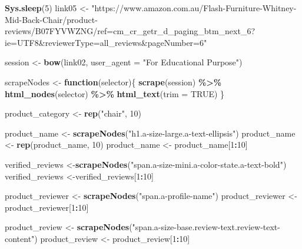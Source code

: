 \documentclass[
]{article}
\newenvironment{Shaded}{\begin{snugshade}}{\end{snugshade}}
\newcommand{\AttributeTok}[1]{\textcolor[rgb]{0.13,0.29,0.53}{#1}}
\newcommand{\ConstantTok}[1]{\textcolor[rgb]{0.56,0.35,0.01}{#1}}
\newcommand{\ControlFlowTok}[1]{\textcolor[rgb]{0.13,0.29,0.53}{\textbf{#1}}}
\newcommand{\DecValTok}[1]{\textcolor[rgb]{0.00,0.00,0.81}{#1}}
\newcommand{\FunctionTok}[1]{\textcolor[rgb]{0.13,0.29,0.53}{\textbf{#1}}}
\newcommand{\NormalTok}[1]{#1}
\newcommand{\OtherTok}[1]{\textcolor[rgb]{0.56,0.35,0.01}{#1}}
\newcommand{\SpecialCharTok}[1]{\textcolor[rgb]{0.81,0.36,0.00}{\textbf{#1}}}
\newcommand{\StringTok}[1]{\textcolor[rgb]{0.31,0.60,0.02}{#1}}
\begin{document}
\begin{Shaded}
\begin{Highlighting}[]
  \FunctionTok{Sys.sleep}\NormalTok{(}\DecValTok{5}\NormalTok{)}
\NormalTok{link05 }\OtherTok{\textless{}{-}} \StringTok{"https://www.amazon.com.au/Flash{-}Furniture{-}Whitney{-}Mid{-}Back{-}Chair/product{-}reviews/B07FYVWZNG/ref=cm\_cr\_getr\_d\_paging\_btm\_next\_6?ie=UTF8\&reviewerType=all\_reviews\&pageNumber=6"}


\NormalTok{  session }\OtherTok{\textless{}{-}} \FunctionTok{bow}\NormalTok{(link02,}
               \AttributeTok{user\_agent =} \StringTok{"For Educational Purpose"}\NormalTok{)}

\NormalTok{  scrapeNodes }\OtherTok{\textless{}{-}} \ControlFlowTok{function}\NormalTok{(selector)\{}
    \FunctionTok{scrape}\NormalTok{(session) }\SpecialCharTok{\%\textgreater{}\%}
      \FunctionTok{html\_nodes}\NormalTok{(selector) }\SpecialCharTok{\%\textgreater{}\%}
      \FunctionTok{html\_text}\NormalTok{(}\AttributeTok{trim =} \ConstantTok{TRUE}\NormalTok{)}
\NormalTok{  \}}

\NormalTok{  product\_category }\OtherTok{\textless{}{-}} \FunctionTok{rep}\NormalTok{(}\StringTok{"chair"}\NormalTok{, }\DecValTok{10}\NormalTok{)}

\NormalTok{  product\_name }\OtherTok{\textless{}{-}} \FunctionTok{scrapeNodes}\NormalTok{(}\StringTok{"h1.a{-}size{-}large.a{-}text{-}ellipsis"}\NormalTok{)}
\NormalTok{  product\_name }\OtherTok{\textless{}{-}} \FunctionTok{rep}\NormalTok{(product\_name, }\DecValTok{10}\NormalTok{)}
\NormalTok{  product\_name }\OtherTok{\textless{}{-}}\NormalTok{ product\_name[}\DecValTok{1}\SpecialCharTok{:}\DecValTok{10}\NormalTok{]}
  
\NormalTok{  verified\_reviews }\OtherTok{\textless{}{-}}\FunctionTok{scrapeNodes}\NormalTok{(}\StringTok{"span.a{-}size{-}mini.a{-}color{-}state.a{-}text{-}bold"}\NormalTok{)}
\NormalTok{  verified\_reviews }\OtherTok{\textless{}{-}}\NormalTok{verified\_reviews[}\DecValTok{1}\SpecialCharTok{:}\DecValTok{10}\NormalTok{]}
  
\NormalTok{  product\_reviewer }\OtherTok{\textless{}{-}} \FunctionTok{scrapeNodes}\NormalTok{(}\StringTok{"span.a{-}profile{-}name"}\NormalTok{)}
\NormalTok{  product\_reviewer }\OtherTok{\textless{}{-}}\NormalTok{ product\_reviewer[}\DecValTok{1}\SpecialCharTok{:}\DecValTok{10}\NormalTok{]}
  
\NormalTok{  product\_review }\OtherTok{\textless{}{-}} \FunctionTok{scrapeNodes}\NormalTok{(}\StringTok{"span.a{-}size{-}base.review{-}text.review{-}text{-}content"}\NormalTok{)}
\NormalTok{  product\_review }\OtherTok{\textless{}{-}}\NormalTok{ product\_review[}\DecValTok{1}\SpecialCharTok{:}\DecValTok{10}\NormalTok{]}
  

\end{Highlighting}
\end{Shaded}
\end{document}
